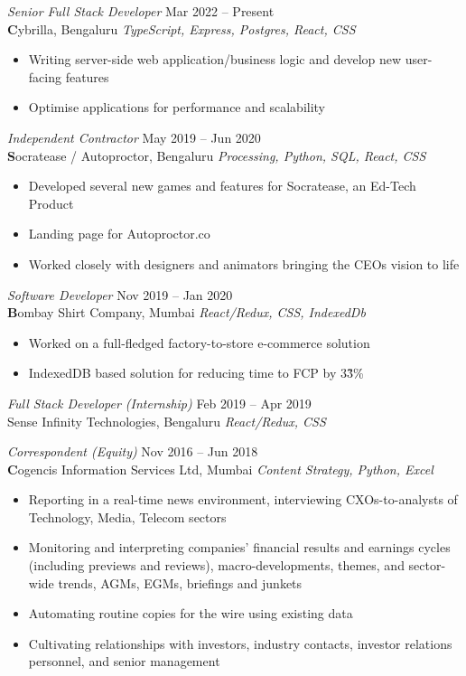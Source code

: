 \documentclass[margin, 10pt]{res} %
\begin{document}
\begin{resume}
{\sl Senior Full Stack Developer} \hfill Mar 2022 – \color{RubineRed} Present\color{Black} \\
\textbf Cybrilla, Bengaluru \hfill {\scriptsize \it TypeScript, Express, Postgres, React, CSS}
\begin{itemize}
\item Writing server-side web application/business logic and develop new user-facing features
\item Optimise applications for performance and scalability
\end{itemize}

{\sl Independent Contractor} \hfill May 2019 – Jun 2020 \\
\textbf Socratease / Autoproctor, Bengaluru \hfill {\scriptsize \it Processing, Python, SQL, React, CSS}
\begin{itemize}
\item Developed several new games and features for Socratease, an Ed-Tech Product
\item Landing page for Autoproctor.co
\item Worked closely with designers and animators bringing the CEOs vision to life 
\end{itemize}

{\sl Software Developer} \hfill Nov 2019 – Jan 2020 \\
\textbf Bombay Shirt Company, Mumbai \hfill {\scriptsize \it React/Redux, CSS, IndexedDb}
\begin{itemize}
\item Worked on a full-fledged factory-to-store e-commerce solution
\item IndexedDB based solution for reducing time to FCP by 3\~3\%
\end{itemize}
{\sl Full Stack Developer (Internship)} \hfill Feb 2019 – Apr 2019 \\
Sense Infinity Technologies, Bengaluru \hfill {\scriptsize \it React/Redux, CSS}

{\sl Correspondent (Equity)} \hfill Nov 2016 – Jun 2018 \\
\textbf Cogencis Information Services Ltd, Mumbai \hfill {\scriptsize \it Content Strategy, Python, Excel}
\begin{itemize}
\item Reporting in a real-time news environment, interviewing CXOs-to-analysts of Technology, Media, Telecom sectors
\item Monitoring and interpreting companies’ financial results and earnings cycles (including previews and reviews), macro-developments, themes, and sector-wide trends, AGMs, EGMs, briefings and junkets
\item Automating routine copies for the wire using existing data
\item Cultivating relationships with investors, industry contacts, investor relations personnel, and senior management


\end{itemize}
\end{resume}
\end{document}
